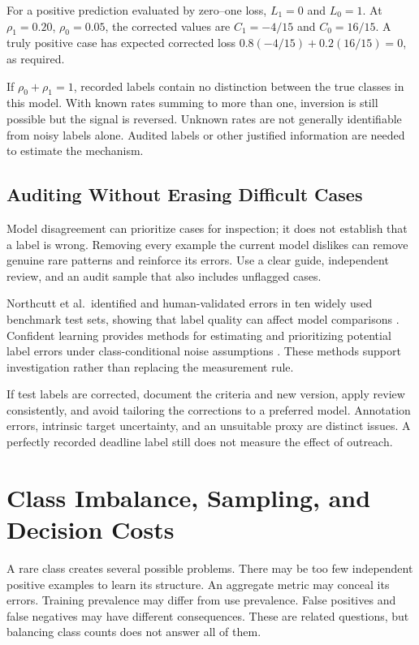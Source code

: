 For a positive prediction evaluated by zero--one loss, $L_1=0$ and $L_0=1$. At $\rho_1=0.20$, $\rho_0=0.05$, the corrected values are $C_1=-4/15$ and $C_0=16/15$. A truly positive case has expected corrected loss $0.8(-4/15)+0.2(16/15)=0$, as required.

If $\rho_0+\rho_1=1$, recorded labels contain no distinction between the true classes in this model. With known rates summing to more than one, inversion is still possible but the signal is reversed. Unknown rates are not generally identifiable from noisy labels alone. Audited labels or other justified information are needed to estimate the mechanism.

\subsection{Auditing Without Erasing Difficult Cases}

Model disagreement can prioritize cases for inspection; it does not establish that a label is wrong. Removing every example the current model dislikes can remove genuine rare patterns and reinforce its errors. Use a clear guide, independent review, and an audit sample that also includes unflagged cases.

Northcutt et al.\ identified and human-validated errors in ten widely used benchmark test sets, showing that label quality can affect model comparisons \citep{northcutt2021labelerrors}. Confident learning provides methods for estimating and prioritizing potential label errors under class-conditional noise assumptions \citep{northcutt2021confidentlearning}. These methods support investigation rather than replacing the measurement rule.

If test labels are corrected, document the criteria and new version, apply review consistently, and avoid tailoring the corrections to a preferred model. Annotation errors, intrinsic target uncertainty, and an unsuitable proxy are distinct issues. A perfectly recorded deadline label still does not measure the effect of outreach.

\section{Class Imbalance, Sampling, and Decision Costs}

A rare class creates several possible problems. There may be too few independent positive examples to learn its structure. An aggregate metric may conceal its errors. Training prevalence may differ from use prevalence. False positives and false negatives may have different consequences. These are related questions, but balancing class counts does not answer all of them.

